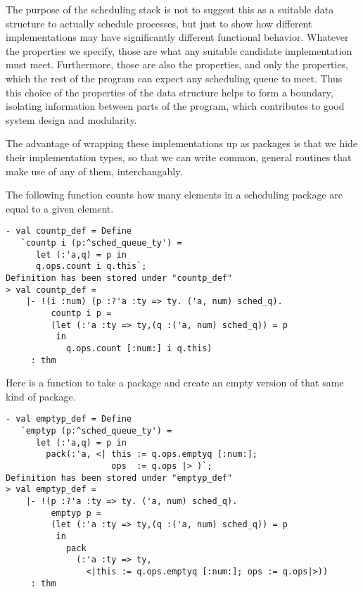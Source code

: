 The purpose of the scheduling stack is not to suggest this as a
suitable data structure to actually schedule processes, but just to
show how different implementations may have significantly different
functional behavior. Whatever the properties we specify, those
are what any suitable candidate implementation must meet.
Furthermore, those are also the properties, and only the 
properties, which the rest of the program can expect any
scheduling queue to meet. Thus this choice of the properties
of the data structure helps to form a boundary, isolating
information between parts of the program, which contributes
to good system design and modularity.

The advantage of wrapping these implementations up as packages
is that we hide their implementation types, so that we can write
common, general routines that make use of any of them, 
interchangably.

\newpage

The following function counts how many elements in a scheduling package
are equal to a given element.
\begin{session}
\begin{verbatim}
- val countp_def = Define
   `countp i (p:^sched_queue_ty') =
      let (:'a,q) = p in
      q.ops.count i q.this`;
Definition has been stored under "countp_def"
> val countp_def =
    |- !(i :num) (p :?'a :ty => ty. ('a, num) sched_q).
         countp i p =
         (let (:'a :ty => ty,(q :('a, num) sched_q)) = p
          in
            q.ops.count [:num:] i q.this)
     : thm
\end{verbatim}
\end{session}

\noindent
Here is a function to take a package and create an empty version 
of that same kind of package.
\begin{session}
\begin{verbatim}
- val emptyp_def = Define
   `emptyp (p:^sched_queue_ty') =
      let (:'a,q) = p in
        pack(:'a, <| this := q.ops.emptyq [:num:];
                     ops  := q.ops |> )`;
Definition has been stored under "emptyp_def"
> val emptyp_def =
    |- !(p :?'a :ty => ty. ('a, num) sched_q).
         emptyp p =
         (let (:'a :ty => ty,(q :('a, num) sched_q)) = p
          in
            pack
              (:'a :ty => ty,
                <|this := q.ops.emptyq [:num:]; ops := q.ops|>))
     : thm
\end{verbatim}
\end{session}

